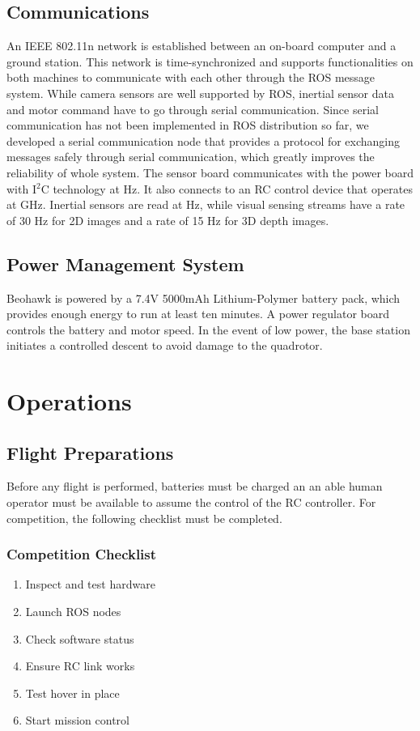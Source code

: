 \documentclass[12pt, letterpaper]{article}
\begin{document}
\subsection{Communications}

An IEEE 802.11n network is established between an on-board computer and a ground station. This network is time-synchronized and supports functionalities on both machines to communicate with each other through the ROS message system. While camera sensors are well supported by ROS, inertial sensor data and motor command have to go through serial communication. Since serial communication has not been implemented in ROS distribution so far, we developed a serial communication node that provides a protocol for exchanging messages safely through serial communication, which greatly improves the reliability of whole system. The sensor board communicates with the power board with I$^2$C technology at  Hz. It also connects to an RC control device that operates at  GHz. Inertial sensors are read at  Hz, while visual sensing streams have a rate of 30 Hz for 2D images and a rate of 15 Hz for 3D depth images.

\subsection{Power Management System}

Beohawk is powered by a 7.4V 5000mAh Lithium-Polymer battery pack, which provides enough energy to run at least ten minutes. A power regulator board controls the battery and motor speed.  In the event of low power, the base station initiates a controlled descent to avoid damage to the quadrotor.

\section{Operations}

\subsection{Flight Preparations}
Before any flight is performed, batteries must be charged an an able human operator must be available to assume the control of the RC controller.  For competition, the following checklist must be completed.

\subsubsection{Competition Checklist}
\begin{enumerate}
  \item Inspect and test hardware
  \item Launch ROS nodes
  \item Check software status
  \item Ensure RC link works
  \item Test hover in place
  \item Start mission control
\end{enumerate}
\end{document}
